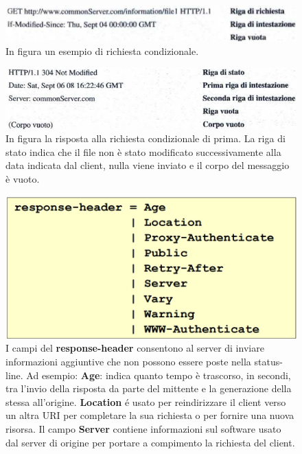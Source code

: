 \documentclass[11pt,a4paper,oneside]{book}
\theoremstyle{definition}
\begin{document}
\begin{figure}[!h]
	\includegraphics[scale=0.3]{Immagini/Cond_HTTP.png}
	\centering
	\caption{In figura un esempio di richiesta condizionale.}
\end{figure}

\pagebreak

\begin{figure}[!h]
	\includegraphics[scale=0.32]{Immagini/Cond_HTTP_risp.png}
	\centering
	\caption{In figura la risposta alla richiesta condizionale di prima. La riga di stato indica che il file non è stato modificato successivamente alla data indicata dal client, nulla viene inviato e il corpo del messaggio è vuoto.}
\end{figure}
\begin{figure}[!h]
	\includegraphics[scale=0.4]{Immagini/Resp_h.png}
	\centering
	\caption{I campi del \textbf{response-header} consentono al server di inviare informazioni aggiuntive che non possono essere poste nella status-line. Ad esempio: \textbf{Age}: indica quanto tempo è trascorso, in secondi, tra l'invio della risposta da parte del mittente e la generazione della stessa all'origine. \textbf{Location} é usato per reindirizzare il client verso un altra URI per completare la sua richiesta o per fornire una nuova risorsa. Il campo \textbf{Server} contiene informazioni sul software usato dal server di origine per portare a compimento la richiesta del client.}
\end{figure}
\end{document}
